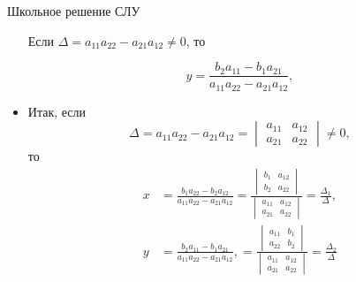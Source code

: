 \documentclass[unicode,11pt,notheorems]{beamer}
\begin{document}
\begin{frame}[allowframebreaks]{Школьное решение СЛУ}
\begin{itemize}
Если $\Delta=a_{11}a_{22}-a_{21}a_{12} \neq 0$, то

$$
	y= \frac{  b_2a_{11} - b_1a_{21}}{a_{11}a_{22}-a_{21}a_{12}},
$$

\framebreak
\item 
	Итак,
	если $$
	\Delta=a_{11}a_{22}-a_{21}a_{12} 
	= \begin{vmatrix}
	a_{11} & a_{12}\\ a_{21} & a_{22}
	\end{vmatrix}
	\neq 0,
	$$
	то
	$$
	\begin{aligned}
		x &= \frac{b_1a_{22} - b_2a_{12}}{a_{11}a_{22}-a_{21}a_{12}}
		=\frac{\begin{vmatrix}
			b_{1} & a_{12}\\ b_{2} & a_{22}
			\end{vmatrix}}{\begin{vmatrix}
			a_{11} & a_{12}\\ a_{21} & a_{22}
			\end{vmatrix}}
		=\frac{\Delta_1}{\Delta}
		,\\
		y &= \frac{  b_2a_{11} - b_1a_{21}}{a_{11}a_{22}-a_{21}a_{12}},
		=\frac{\begin{vmatrix}	a_{11} & b_{1}\\ a_{22} &  b_{2}			\end{vmatrix}}{\begin{vmatrix}
			a_{11} & a_{12}\\ a_{21} & a_{22}
			\end{vmatrix}}	
		=\frac{\Delta_2}{\Delta}
	\end{aligned}
	$$
\end{itemize}


\end{frame}
\end{document}
